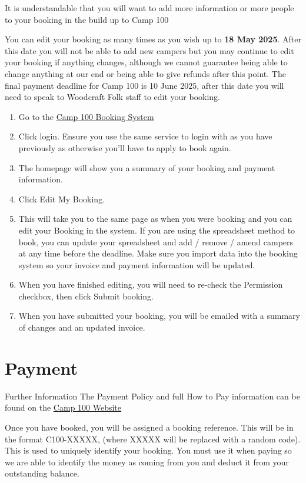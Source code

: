 \documentclass[a4paper, 11pt]{report}
\begin{document}
It is understandable that you will want to add more information or more people to your booking in the build up to Camp 100 

You can edit your booking as many times as you wish up to \textbf{18 May 2025}. After this date you will not be able to add new campers but you may continue to edit your booking if anything changes, although we cannot guarantee being able to change anything at our end or being able to give refunds after this point. The final payment deadline for Camp 100 is 10 June 2025, after this date you will need to speak to Woodcraft Folk staff to edit your booking. 
\begin{enumerate}
    \item Go to the \href{https://bookings.camp100.org.ukj}{Camp 100 Booking System}
    \item Click login. Ensure you use the same service to login with as you have previously as otherwise you'll have to apply to book again.
    \item The homepage will show you a summary of your booking and payment information.
    \item Click Edit My Booking.
    \item This will take you to the same page as when you were booking and you can edit your Booking in the system. If you are using the spreadsheet method to book, you can update your spreadsheet and add / remove / amend campers at any time before the deadline. Make sure you import data into the booking system so your invoice and payment information will be updated.
    \item When you have finished editing, you will need to re-check the Permission checkbox, then click Submit booking.
    \item When you have submitted your booking, you will be emailed with a summary of changes and an updated invoice.
\end{enumerate}

\chapter{Payment}
\label{chap:payment}

\begin{callout-orange}{Further Information}
The Payment Policy and full How to Pay information can be found on the \href{https://camp100.org.uk}{Camp 100 Website}
\end{callout-orange}

Once you have booked, you will be assigned a booking reference. This will be in the format C100-XXXXX, (where XXXXX will be replaced with a random code). This is used to uniquely identify your booking. You must use it when paying so we are able to identify the money as coming from you and deduct it from your outstanding balance.
\end{document}
